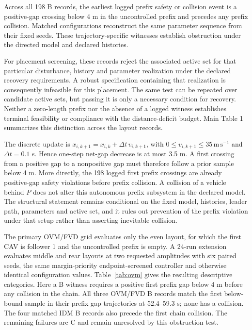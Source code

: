 \documentclass[11pt]{article}
\begin{document}
Across all 198 B records, the earliest logged prefix safety or collision event is a positive-gap crossing below 4 m in the uncontrolled prefix and precedes any prefix collision. Matched configurations reconstruct the same parameter sequence from their fixed seeds. These trajectory-specific witnesses establish obstruction under the directed model and declared histories.

For placement screening, these records reject the associated active set for that particular disturbance, history and parameter realization under the declared recovery requirements. A robust specification containing that realization is consequently infeasible for this placement. The same test can be repeated over candidate active sets, but passing it is only a necessary condition for recovery. Neither a zero-length prefix nor the absence of a logged witness establishes terminal feasibility or compliance with the distance-deficit budget. Main Table 1 summarizes this distinction across the layout records.

The discrete update is $x_{i,k+1}=x_{i,k}+\Delta t\,v_{i,k+1}$, with $0\le v_{i,k+1}\le35\,\mathrm{m\,s^{-1}}$ and $\Delta t=0.1$ s. Hence one-step net-gap decrease is at most 3.5 m. A first crossing from a positive gap to a nonpositive gap must therefore follow a prior sample below 4 m. More directly, the 198 logged first prefix crossings are already positive-gap safety violations before prefix collision. A collision of a vehicle behind $P$ does not alter this autonomous prefix subsystem in the declared model. The structural statement remains conditional on the fixed model, histories, leader path, parameters and active set, and it rules out prevention of the prefix violation under that setup rather than asserting inevitable collision.

The primary OVM/FVD grid evaluates only the even layout, for which the first CAV is follower 1 and the uncontrolled prefix is empty. A 24-run extension evaluates middle and rear layouts at two requested amplitudes with six paired seeds, the same margin-priority endpoint-screened controller and otherwise identical configuration values. Table~\ref{tab:ovm} gives the resulting descriptive categories. Here a B witness requires a positive first prefix gap below 4 m before any collision in the chain. All three OVM/FVD B records match the first below-bound sample in their prefix gap trajectories at 52.4--59.3 s; none has a collision. The four matched IDM B records also precede the first chain collision. The remaining failures are C and remain unresolved by this obstruction test.
\end{document}
